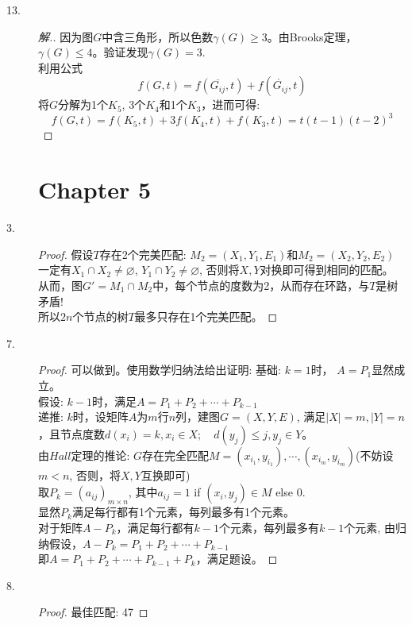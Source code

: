 \documentclass[UTF8, onecolumn, a4paper]{article}
\begin{document}
\begin{description}
\item[13.]
\begin{proof}[解.]
因为图$G$中含三角形，所以色数$\gamma(G) \geq 3$。由Brooks定理，$\gamma(G) \leq 4$。验证发现$\gamma(G) = 3$.\\
利用公式$$f(G, t) = f(\overline{G_{ij}}, t) + f(\mathring{G_{ij}}, t)$$
将$G$分解为1个$K_5$, 3个$K_4$和1个$K_3$，进而可得:
$$f(G, t) = f(K_5, t) + 3f(K_4, t) + f(K_3, t) = t(t-1)(t-2)^3$$
\end{proof}

\section*{Chapter 5}
\item[3.]
\begin{proof}
假设$T$存在2个完美匹配: $M_2 = (X_1, Y_1, E_1)$和$M_2 = (X_2, Y_2, E_2)$\\
一定有$X_1\cap X_2\neq \varnothing$, $Y_1\cap Y_2\neq \varnothing$,  否则将$X, Y$对换即可得到相同的匹配。\\
从而，图$G' = M_1\cap M_2$中，每个节点的度数为2，从而存在环路，与$T$是树矛盾!\\
所以$2n$个节点的树$T$最多只存在1个完美匹配。
\end{proof}


\item[7.]
\begin{proof}可以做到。使用数学归纳法给出证明:
基础: $k = 1$时， $A = P_1$显然成立。\\
假设: $k-1$时，满足$A = P_1 + P_2 + \cdots + P_{k-1}$\\
递推: $k$时，设矩阵$A$为$m$行$n$列，建图$G = (X, Y, E)$, 满足$|X| = m, |Y| = n$，且节点度数$d(x_i) = k,x_i \in X; \quad d(y_j) \leq j, y_j\in Y$。\\
由$Hall$定理的推论: $G$存在完全匹配$M = {(x_{i_1}, y_{i_1}), \cdots, (x_{i_m}, y_{i_m})}$(不妨设$m < n$, 否则，将$X, Y$互换即可)\\
取$P_k = (a_{ij})_{m\times n}$, 其中$a_{ij} = 1$ if $(x_i, y_j)\in M$ else 0.\\
显然$P_k$满足每行都有1个元素，每列最多有1个元素。\\
对于矩阵$A-P_k$，满足每行都有$k-1$个元素，每列最多有$k-1$个元素, 由归纳假设，$A-P_k = P_1 + P_2 + \cdots + P_{k-1}$\\
即$A = P_1 + P_2 + \cdots + P_{k-1} + P_k$，满足题设。
\end{proof}

\item[8.]
\begin{proof}
最佳匹配: 47
\end{proof}


\end{description}
\end{document}
